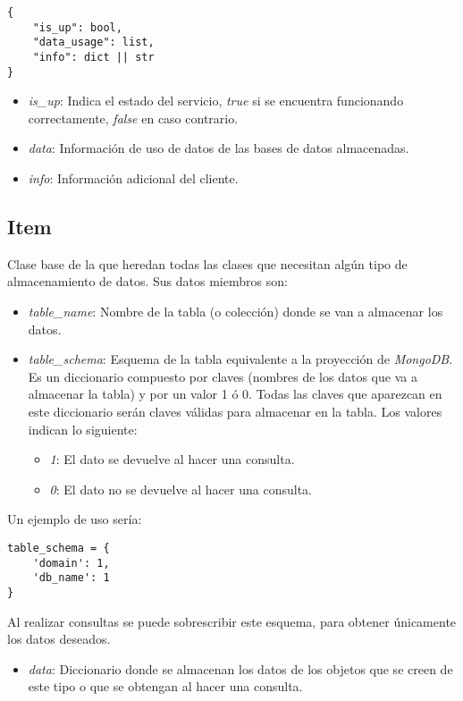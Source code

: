 \begin{lstlisting}
{
	"is_up": bool,
	"data_usage": list,
	"info": dict || str
}
\end{lstlisting}

\begin{itemize}
	\item \textit{is\_up}: Indica el estado del servicio, \textit{true} si se encuentra funcionando correctamente, \textit{false} en caso contrario.
	\item \textit{data}: Información de uso de datos de las bases de datos almacenadas.
	\item \textit{info}: Información adicional del cliente.
\end{itemize}



\subsection{Item}

Clase base de la que heredan todas las clases que necesitan algún tipo de almacenamiento de datos. Sus datos miembros son:
\begin{itemize}
	\item \textit{table\_name}: Nombre de la tabla (o colección) donde se van a almacenar los datos.
	\item \textit{table\_schema}: Esquema de la tabla equivalente a la proyección de \textit{MongoDB}. Es un diccionario compuesto por claves (nombres de los datos que va a almacenar la tabla) y por un valor 1 ó 0. Todas las claves que aparezcan en este diccionario serán claves válidas para almacenar en la tabla. Los valores indican lo siguiente:
	\begin{itemize}
		\item \textit{1}: El dato se devuelve al hacer una consulta.
		\item \textit{0}: El dato no se devuelve al hacer una consulta.
	\end{itemize}
\end{itemize}

\bigskip
Un ejemplo de uso sería:

\begin{lstlisting}
table_schema = {
	'domain': 1,
	'db_name': 1
}
\end{lstlisting}

\bigskip
Al realizar consultas se puede sobrescribir este esquema, para obtener únicamente los datos deseados.
\begin{itemize}
	\item \textit{data}: Diccionario donde se almacenan los datos de los objetos que se creen de este tipo o que se obtengan al hacer una consulta.
\end{itemize}


